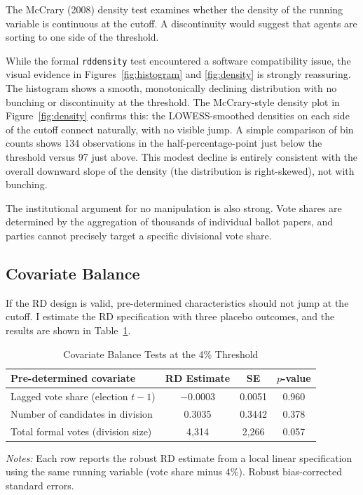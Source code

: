 \documentclass[12pt, a4paper]{article}
\begin{document}
The McCrary (2008) density test examines whether the density of the running variable is continuous at the cutoff. A discontinuity would suggest that agents are sorting to one side of the threshold.

While the formal \texttt{rddensity} test encountered a software compatibility issue, the visual evidence in Figures~\ref{fig:histogram} and \ref{fig:density} is strongly reassuring. The histogram shows a smooth, monotonically declining distribution with no bunching or discontinuity at the threshold. The McCrary-style density plot in Figure~\ref{fig:density} confirms this: the LOWESS-smoothed densities on each side of the cutoff connect naturally, with no visible jump. A simple comparison of bin counts shows 134 observations in the half-percentage-point just below the threshold versus 97 just above. This modest decline is entirely consistent with the overall downward slope of the density (the distribution is right-skewed), not with bunching.

The institutional argument for no manipulation is also strong. Vote shares are determined by the aggregation of thousands of individual ballot papers, and parties cannot precisely target a specific divisional vote share.

\subsection{Covariate Balance}

If the RD design is valid, pre-determined characteristics should not jump at the cutoff. I estimate the RD specification with three placebo outcomes, and the results are shown in Table~\ref{tab:balance}.

\begin{table}[H]
\centering
\caption{Covariate Balance Tests at the 4\% Threshold}
\label{tab:balance}
\begin{tabular}{lccc}
\toprule
\textbf{Pre-determined covariate} & \textbf{RD Estimate} & \textbf{SE} & \textbf{$p$-value} \\
\midrule
Lagged vote share (election $t-1$) & $-$0.0003 & 0.0051 & 0.960 \\
Number of candidates in division & 0.3035 & 0.3442 & 0.378 \\
Total formal votes (division size) & 4,314 & 2,266 & 0.057 \\
\bottomrule
\end{tabular}
\begin{minipage}{\textwidth}
\vspace{0.3em}
\footnotesize
\textit{Notes:} Each row reports the robust RD estimate from a local linear specification using the same running variable (vote share minus 4\%). Robust bias-corrected standard errors.
\end{minipage}
\end{table}
\end{document}
